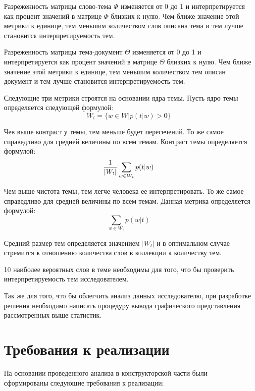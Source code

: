 Разреженность матрицы слово-тема $\Phi$ изменяется от 0 до 1 и интерпретируется как процент значений в матрице $\Phi$ близких к нулю. Чем ближе значение этой метрики к единице, тем меньшим количеством слов описана тема и тем лучше становится интерпретируемость тем.

Разреженность матрицы тема-документ $\Theta$ изменяется от 0 до 1 и интерпретируется как процент значений в матрице $\Theta$ близких к нулю. Чем ближе значение этой метрики к единице, тем меньшим количеством тем описан документ и тем лучше становится интерпретируемость тем.

Следующие три метрики строятся на основании ядра темы. Пусть ядро темы определяется следующей формулой:
\begin{equation}
W_t = \{
    w \in W|p(t|w) > 0
\}
\end{equation}

Чев выше контраст у темы, тем меньше будет пересечений. То же самое справедливо для средней величины по всем темам. Контраст темы определяется формулой:
\begin{equation}
{{1}\over{|W_t|}}\sum_{w \in W_t}{
    p(t|w)
}
\end{equation}

Чем выше чистота темы, тем легче человека ее интерпретировать. То же самое справедливо для средней величины по всем темам. Данная метрика определяется формулой:
\begin{equation}
\sum_{w \in W_t}{
    p(w|t)
}
\end{equation}

Средний размер тем определяется значением $|W_t|$ и в оптимальном случае стремится к отношению количества слов в коллекции к количеству тем.

10 наиболее вероятных слов в теме необходимы для того, что бы проверить интерпретируемость тем исследователем.

Так же для того, что бы облегчить анализ данных исследователю, при разработке решения необходимо написать процедуру вывода графического представления рассмотренных выше статистик.

%
\section{Требования к реализации}

На основании проведенного анализа в конструкторской части были сформированы следующие требования к реализации:

